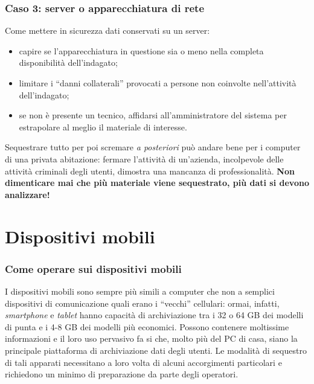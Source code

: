 \documentclass[11pt]{beamer}
\begin{document}
	\begin{frame}
		\frametitle{Caso 3: server o apparecchiatura di rete}
		
		Come mettere in sicurezza dati conservati su un server:
		
		\begin{itemize}
			\item capire se l'apparecchiatura in questione sia o meno nella completa disponibilità dell'indagato;
			\item limitare i ``danni collaterali'' provocati a persone non coinvolte nell'attività dell'indagato;
			\item se non è presente un tecnico, affidarsi all'amministratore del sistema per estrapolare al meglio il materiale di interesse.
			
		\end{itemize} 		
		Sequestrare tutto per poi scremare \textit{a posteriori} può andare bene per i computer  di una privata abitazione: fermare l'attività di un'azienda, incolpevole delle attività criminali degli utenti, dimostra una mancanza di professionalità. 
		\vfill
		\textbf{Non dimenticare mai che più materiale viene sequestrato, più dati si devono analizzare!}
		
	\end{frame}
		
	\section[Disp. mobili]{Dispositivi mobili}
	\begin{frame}
		\frametitle{Come operare sui dispositivi mobili}
		I dispositivi mobili sono sempre più simili a computer che non a semplici dispositivi di comunicazione quali erano i ``vecchi'' cellulari: ormai, infatti, \textit{smartphone} e \textit{tablet} hanno capacità di archiviazione tra i 32 o 64 GB dei modelli di punta e i 4-8 GB dei modelli più economici. Possono contenere moltissime informazioni e il loro uso pervasivo fa si che, molto più del PC di casa, siano la principale piattaforma di archiviazione dati degli utenti.
		\vfill
		Le modalità di sequestro di tali apparati necessitano a loro volta di alcuni accorgimenti particolari e richiedono un minimo di preparazione da parte degli operatori.
	\end{frame}
	
\end{document}
